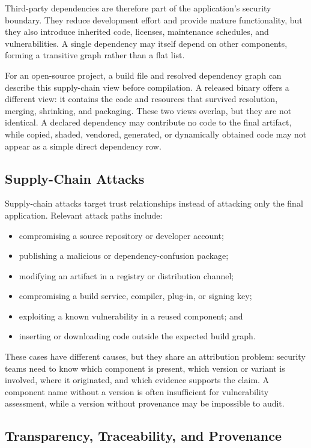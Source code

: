 Third-party dependencies are therefore part of the application's security
boundary. They reduce development effort and provide mature functionality,
but they also introduce inherited code, licenses, maintenance schedules, and
vulnerabilities. A single dependency may itself depend on other components,
forming a transitive graph rather than a flat list.

For an open-source project, a build file and resolved dependency graph can
describe this supply-chain view before compilation. A released binary offers
a different view: it contains the code and resources that survived resolution,
merging, shrinking, and packaging. These two views overlap, but they are not
identical. A declared dependency may contribute no code to the final artifact,
while copied, shaded, vendored, generated, or dynamically obtained code may
not appear as a simple direct dependency row.

\subsection{Supply-Chain Attacks}

Supply-chain attacks target trust relationships instead of attacking only the
final application. Relevant attack paths include:

\begin{itemize}
  \item compromising a source repository or developer account;
  \item publishing a malicious or dependency-confusion package;
  \item modifying an artifact in a registry or distribution channel;
  \item compromising a build service, compiler, plug-in, or signing key;
  \item exploiting a known vulnerability in a reused component; and
  \item inserting or downloading code outside the expected build graph.
\end{itemize}

These cases have different causes, but they share an attribution problem:
security teams need to know which component is present, which version or
variant is involved, where it originated, and which evidence supports the
claim. A component name without a version is often insufficient for
vulnerability assessment, while a version without provenance may be
impossible to audit.

\subsection{Transparency, Traceability, and Provenance}


